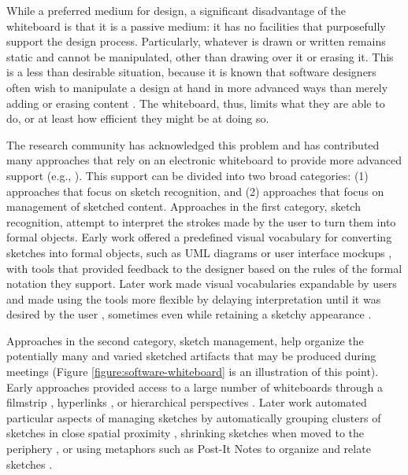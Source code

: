 \documentclass[12pt,fleqn]{ucithesis}
\begin{document}
While a preferred medium for design, a significant disadvantage of the whiteboard is that it is a passive medium: it has no facilities that purposefully support the design process. Particularly, whatever is drawn or written remains static and cannot be manipulated, other than drawing over it or erasing it. This is a less than desirable situation, because it is known that software designers often wish to manipulate a design at hand in more advanced ways than merely adding or erasing content \cite{dekel2007notation}. The whiteboard, thus, limits what they are able to do, or at least how efficient they might be at doing so.

The research community has acknowledged this problem and has contributed many approaches that rely on an electronic whiteboard to provide more advanced support (e.g., \cite{chen2008sumlow, landay1995interactive, hammond2006ladder, damm2000supporting, chung2005inkkit}). This support can be divided into two broad categories: (1) approaches that focus on sketch recognition, and (2) approaches that focus on management of sketched content. Approaches in the first category, sketch recognition, attempt to interpret the strokes made by the user to turn them into formal  objects. Early work offered a predefined visual vocabulary for converting sketches into formal objects, such as UML diagrams \cite{chen2008sumlow} or user interface mockups \cite{landay1995interactive}, with tools that provided feedback to the designer based on the rules of the formal notation they support. Later work made visual vocabularies expandable by users \cite{hammond2006ladder} and made using the tools more flexible by delaying interpretation until it was desired by the user \cite{damm2000supporting}, sometimes even while retaining a sketchy appearance \cite{chung2005inkkit}.

Approaches in the second category, sketch management, help organize the potentially many and varied sketched artifacts that may be produced during meetings (Figure \ref{figure:software-whiteboard} is an illustration of this point). Early approaches provided access to a large number of whiteboards through a filmstrip \cite{stefik1987beyond}, hyperlinks \cite{Streitz:1994:DIM:192844.193044}, or hierarchical perspectives \cite{newman2003denim}. Later work automated particular aspects of managing sketches by automatically grouping clusters of sketches in close spatial proximity \cite{mynatt1999flatland}, shrinking sketches when moved to the periphery \cite{guimbretiere2001fluid}, or using metaphors such as Post-It Notes to organize and relate sketches \cite{klemmer2001designers}.  
\end{document}
